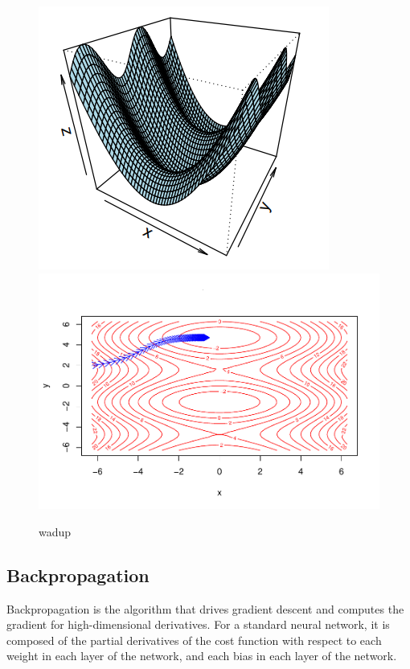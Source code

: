 \begin{figure}[H]
    \includegraphics[width = .4\textwidth]{Figures/grad_desc-51.png}
    \includegraphics[width = .6\textwidth]{Figures/grad_desc-50.pdf}
    \caption{wadup}
    \label{grad}
\end{figure}


\hypertarget{backpropagation}{%
\subsection{Backpropagation}\label{backpropagation}}

Backpropagation is the algorithm that drives gradient descent and computes the gradient for high-dimensional derivatives. For a standard neural network, it is composed of the partial derivatives of the cost function with respect to each weight in each layer of the network, and each bias in each layer of the network.

